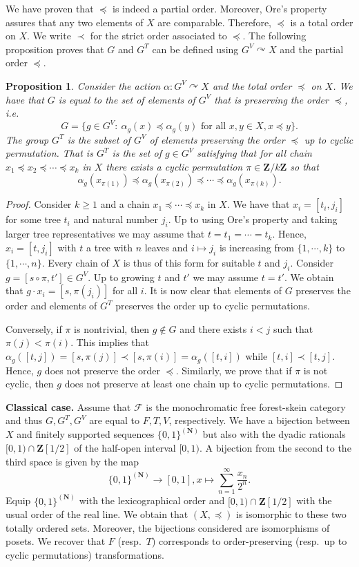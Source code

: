 \documentclass[a4paper, 12pt]{amsart}
\numberwithin{equation}{section}
\newtheorem{proposition}[theorem]{Proposition}
\theoremstyle{definition}
\newcommand{\act}{\curvearrowright}
\newcommand{\al}{\alpha}
\newcommand{\cF}{\mathcal F}
\newcommand{\N}{\mathbf{N}}
\newcommand{\Z}{\mathbf{Z}}
\begin{document}
We have proven that $\preceq$ is indeed a partial order. 
Moreover, Ore's property assures that any two elements of $X$ are comparable.
Therefore, $\preceq$ is a total order on $X$.
We write $\prec$ for the strict order associated to $\preceq$.
The following proposition proves that $G$ and $G^T$ can be defined using $G^V\act X$ and the partial order $\preceq$.

\begin{proposition}\label{prop:order-preserving}
Consider the action $\al:G^V\act X$ and the total order $\preceq$ on $X$.
We have that $G$ is equal to the set of elements of $G^V$ that is preserving the order $\preceq$, i.e.~
$$G=\{ g\in G^V:\ \al_g(x)\preceq \al_g(y) \text{ for all } x,y\in X, x\preceq y\}.$$
The group $G^T$ is the subset of $G^V$ of elements preserving the order $\preceq$ up to cyclic permutation.
That is $G^T$ is the set of $g\in G^V$ satisfying that for all chain $x_1\preceq x_2\preceq \cdots \preceq x_k$ in $X$ there exists a cyclic permutation $\pi\in\Z/k\Z$ so that
$$\al_g(x_{\pi(1)}) \preceq \al_g(x_{\pi(2)})\preceq \cdots \preceq \al_g(x_{\pi(k)}).$$
\end{proposition}

\begin{proof}
Consider $k\geq 1$ and a chain $x_1\preceq \cdots\preceq x_k$ in $X$.
We have that $x_i=[t_i,j_i]$ for some tree $t_i$ and natural number $j_i$.
Up to using Ore's property and taking larger tree representatives we may assume that $t=t_1=\cdots=t_k$.
Hence, $x_i=[t,j_i]$ with $t$ a tree with $n$ leaves and $i\mapsto j_i$ is increasing from $\{1,\cdots,k\}$ to $\{1,\cdots,n\}.$
Every chain of $X$ is thus of this form for suitable $t$ and $j_i$.
Consider $g=[s\circ \pi ,t']\in G^V$.
Up to growing $t$ and $t'$ we may assume $t=t'$.
We obtain that $g\cdot x_i= [s, \pi(j_i)]$ for all $i$.
It is now clear that elements of $G$ preserves the order and elements of $G^T$ preserves the order up to cyclic permutations.

Conversely, if $\pi$ is nontrivial, then $g\notin G$ and there exists $i<j$ such that $\pi(j)<\pi(i)$. This implies that $\al_g([t,j])=[s,\pi(j)]\prec [s,\pi(i)]=\al_g([t,i])$ while $[t,i]\prec [t,j]$.
Hence, $g$ does not preserve the order $\preceq.$
Similarly, we prove that if $\pi$ is not cyclic, then $g$ does not preserve at least one chain up to cyclic permutations.
\end{proof}

{\bf Classical case.}
Assume that $\cF$ is the monochromatic free forest-skein category and thus $G,G^T,G^V$ are equal to $F,T,V$, respectively.
We have a bijection between $X$ and finitely supported sequences $\{0,1\}^{(\N)}$ but also with the dyadic rationals $[0,1)\cap \Z[1/2]$ of the half-open interval $[0,1)$.
A bijection from the second to the third space is given by the map
$$\{0,1\}^{(\N)}\to [0,1], x\mapsto \sum_{n=1}^\infty \frac{x_n}{2^n}.$$
Equip $\{0,1\}^{(\N)}$ with the lexicographical order and $[0,1)\cap \Z[1/2]$ with the usual order of the real line.
We obtain that $(X,\preceq)$ is isomorphic to these two totally ordered sets. Moreover, the bijections considered are isomorphisms of posets.
We recover that $F$ (resp.~$T$) corresponds to order-preserving (resp.~up to cyclic permutations) transformations.
\end{document}
